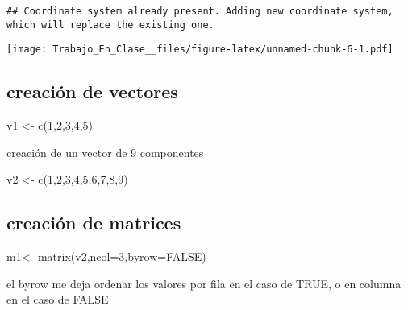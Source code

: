 \documentclass[]{elsarticle} %
\newenvironment{Shaded}{\begin{snugshade}}{\end{snugshade}}
\newcommand{\AttributeTok}[1]{\textcolor[rgb]{0.77,0.63,0.00}{#1}}
\newcommand{\ConstantTok}[1]{\textcolor[rgb]{0.00,0.00,0.00}{#1}}
\newcommand{\DecValTok}[1]{\textcolor[rgb]{0.00,0.00,0.81}{#1}}
\newcommand{\FunctionTok}[1]{\textcolor[rgb]{0.00,0.00,0.00}{#1}}
\newcommand{\NormalTok}[1]{#1}
\newcommand{\OtherTok}[1]{\textcolor[rgb]{0.56,0.35,0.01}{#1}}
\begin{document}
\begin{verbatim}
## Coordinate system already present. Adding new coordinate system, which will replace the existing one.
\end{verbatim}

\texttt{[image: Trabajo\_En\_Clase\_\_files/figure-latex/unnamed-chunk-6-1.pdf]}

\hypertarget{creaciuxf3n-de-vectores}{%
\subsection{creación de vectores}\label{creaciuxf3n-de-vectores}}

\begin{Shaded}
\begin{Highlighting}[]
\NormalTok{v1 }\OtherTok{\textless{}{-}} \FunctionTok{c}\NormalTok{(}\DecValTok{1}\NormalTok{,}\DecValTok{2}\NormalTok{,}\DecValTok{3}\NormalTok{,}\DecValTok{4}\NormalTok{,}\DecValTok{5}\NormalTok{)}
\end{Highlighting}
\end{Shaded}

creación de un vector de 9 componentes

\begin{Shaded}
\begin{Highlighting}[]
\NormalTok{v2 }\OtherTok{\textless{}{-}} \FunctionTok{c}\NormalTok{(}\DecValTok{1}\NormalTok{,}\DecValTok{2}\NormalTok{,}\DecValTok{3}\NormalTok{,}\DecValTok{4}\NormalTok{,}\DecValTok{5}\NormalTok{,}\DecValTok{6}\NormalTok{,}\DecValTok{7}\NormalTok{,}\DecValTok{8}\NormalTok{,}\DecValTok{9}\NormalTok{)}
\end{Highlighting}
\end{Shaded}

\hypertarget{creaciuxf3n-de-matrices}{%
\subsection{creación de matrices}\label{creaciuxf3n-de-matrices}}

\begin{Shaded}
\begin{Highlighting}[]
\NormalTok{m1}\OtherTok{\textless{}{-}} \FunctionTok{matrix}\NormalTok{(v2,}\AttributeTok{ncol=}\DecValTok{3}\NormalTok{,}\AttributeTok{byrow=}\ConstantTok{FALSE}\NormalTok{)}
\end{Highlighting}
\end{Shaded}

el byrow me deja ordenar los valores por fila en el caso de TRUE, o en
columna en el caso de FALSE
\end{document}
